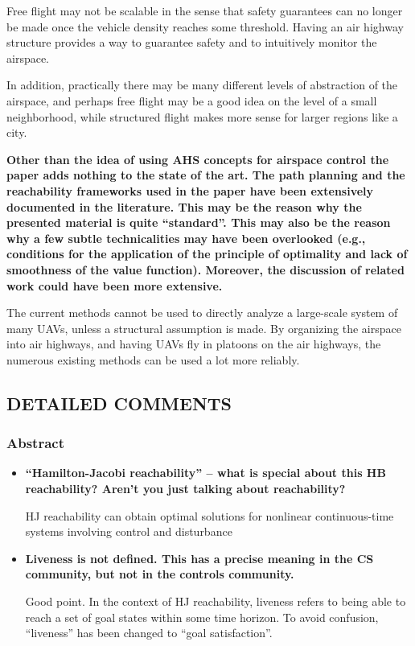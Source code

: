 \documentclass[submit]{aiaa-pretty}
\begin{document}
Free flight may not be scalable in the sense that safety guarantees can no longer be made once the vehicle density reaches some threshold. Having an air highway structure provides a way to guarantee safety and to intuitively monitor the airspace. 

In addition, practically there may be many different levels of abstraction of the airspace, and perhaps free flight may be a good idea on the level of a small neighborhood, while structured flight makes more sense for larger regions like a city.

\textbf{Other than the idea of using AHS concepts for airspace control the paper adds nothing to the state of the art. The path planning and the reachability frameworks used in the paper have been extensively documented in the literature. This may be the reason why the presented material is quite “standard”. This may also be the reason why a few subtle technicalities may have been overlooked (e.g., conditions for the application of the principle of optimality and lack of smoothness of the value function). Moreover, the discussion of related work could have been more extensive.}

The current methods cannot be used to directly analyze a large-scale system of many UAVs, unless a structural assumption is made. By organizing the airspace into air highways, and having UAVs fly in platoons on the air highways, the numerous existing methods can be used a lot more reliably.

\subsection{DETAILED COMMENTS}
\subsubsection{Abstract}
\begin{itemize}
\item \textbf{“Hamilton-Jacobi reachability” – what is special about this HB reachability? Aren’t you just talking about reachability?}

HJ reachability can obtain optimal solutions for nonlinear continuous-time systems involving control and disturbance

\item \textbf{Liveness is not defined. This has a precise meaning in the CS community, but not in the controls community.}

Good point. In the context of HJ reachability, liveness refers to being able to reach a set of goal states within some time horizon. To avoid confusion, ``liveness'' has been changed to ``goal satisfaction''.
\end{itemize}
\end{document}
